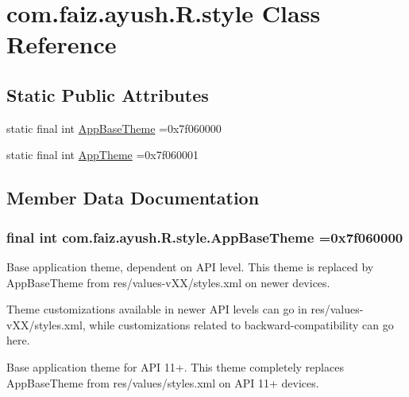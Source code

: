 \hypertarget{classcom_1_1faiz_1_1ayush_1_1_r_1_1style}{}\section{com.\+faiz.\+ayush.\+R.\+style Class Reference}
\label{classcom_1_1faiz_1_1ayush_1_1_r_1_1style}
\subsection*{Static Public Attributes}
\begin{DoxyCompactItemize}
\item 
static final int \hyperlink{classcom_1_1faiz_1_1ayush_1_1_r_1_1style_acba94c51a1b67c34eb3bd905ef4022e3}{App\+Base\+Theme} =0x7f060000
\item 
static final int \hyperlink{classcom_1_1faiz_1_1ayush_1_1_r_1_1style_ae61203b5c9d9b4a831dd3219f88fae0d}{App\+Theme} =0x7f060001
\end{DoxyCompactItemize}


\subsection{Member Data Documentation}
\hypertarget{classcom_1_1faiz_1_1ayush_1_1_r_1_1style_acba94c51a1b67c34eb3bd905ef4022e3}{}
\subsubsection[{App\+Base\+Theme}]{\setlength{\rightskip}{0pt plus 5cm}final int com.\+faiz.\+ayush.\+R.\+style.\+App\+Base\+Theme =0x7f060000\hspace{0.3cm}{\ttfamily [static]}}\label{classcom_1_1faiz_1_1ayush_1_1_r_1_1style_acba94c51a1b67c34eb3bd905ef4022e3}
Base application theme, dependent on A\+P\+I level. This theme is replaced by App\+Base\+Theme from res/values-\/v\+X\+X/styles.\+xml on newer devices.

\begin{DoxyVerb}       Theme customizations available in newer API levels can go in
       res/values-vXX/styles.xml, while customizations related to
       backward-compatibility can go here.


   Base application theme for API 11+. This theme completely replaces
   AppBaseTheme from res/values/styles.xml on API 11+ devices.
\end{DoxyVerb}


